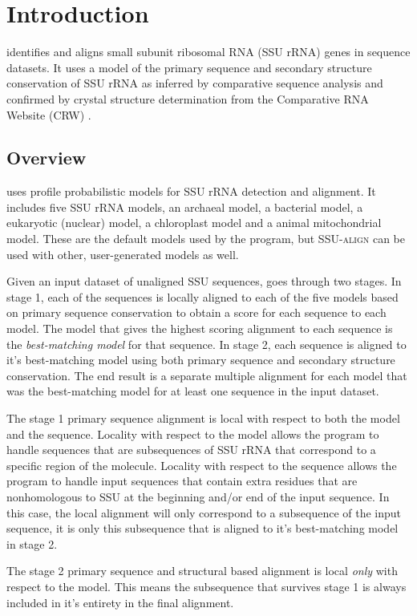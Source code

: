 \section{Introduction}

 identifies and aligns small subunit ribosomal RNA
(SSU rRNA) genes in sequence datasets. It uses a model of the primary
sequence and secondary structure conservation of SSU rRNA as inferred
by comparative sequence analysis and confirmed by crystal structure
determination from the Comparative RNA Website (CRW) \citep{Cannone02}.

\subsection{Overview}
 uses profile probabilistic models for SSU rRNA
detection and alignment. It includes five SSU rRNA models, an archaeal
model, a bacterial model, a eukaryotic (nuclear) model, a
chloroplast model and a animal mitochondrial model. These are the
default models used by the program, but \textsc{SSU-align} can be used
with other, user-generated models as well.

Given an input dataset of unaligned SSU sequences,
 goes through two stages. In stage 1, each of the
sequences is locally aligned to each of the five models based on
primary sequence conservation to obtain a score for each sequence to
each model.  The model that gives the highest scoring alignment to
each sequence is the \emph{best-matching model} for that sequence.  In
stage 2, each sequence is aligned to it's best-matching model using
both primary sequence and secondary structure conservation. The end
result is a separate multiple alignment for each model that was the
best-matching model for at least one sequence in the input dataset.

The stage 1 primary sequence alignment is local with respect to both
the model and the sequence. Locality with respect to the model allows
the program to handle sequences that are subsequences of SSU
rRNA that correspond to a specific region of the molecule. Locality
with respect to the sequence allows the program to handle input
sequences that contain extra residues that are nonhomologous to SSU at
the beginning and/or end of the input sequence. In this case, the
local alignment will only correspond to a subsequence of the input
sequence, it is only this subsequence that is aligned to it's
best-matching model in stage 2.

The stage 2 primary sequence and structural based alignment is local
\emph{only} with respect to the model.  This means the subsequence
that survives stage 1 is always included in it's entirety in the final
alignment.

